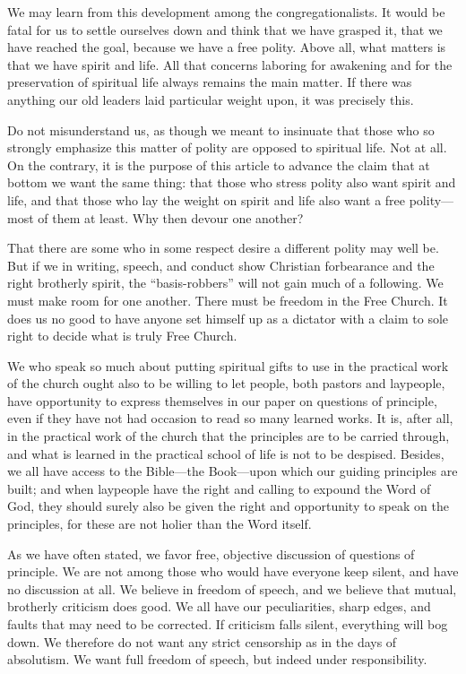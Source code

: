 We may learn from this development among the congregationalists. It would be fatal for us to settle ourselves down and think that we have grasped it, that we have reached the goal, because we have a free polity. Above all, what matters is that we have spirit and life. All that concerns laboring for awakening and for the preservation of spiritual life always remains the main matter. If there was anything our old leaders laid particular weight upon, it was precisely this.

Do not misunderstand us, as though we meant to insinuate that those who so strongly emphasize this matter of polity are opposed to spiritual life. Not at all. On the contrary, it is the purpose of this article to advance the claim that at bottom we want the same thing: that those who stress polity also want spirit and life, and that those who lay the weight on spirit and life also want a free polity---most of them at least. Why then devour one another?

That there are some who in some respect desire a different polity may well be. But if we in writing, speech, and conduct show Christian forbearance and the right brotherly spirit, the ``basis-robbers'' will not gain much of a following. We must make room for one another. There must be freedom in the Free Church. It does us no good to have anyone set himself up as a dictator with a claim to sole right to decide what is truly Free Church.

We who speak so much about putting spiritual gifts to use in the practical work of the church ought also to be willing to let people, both pastors and laypeople, have opportunity to express themselves in our paper on questions of principle, even if they have not had occasion to read so many learned works. It is, after all, in the practical work of the church that the principles are to be carried through, and what is learned in the practical school of life is not to be despised. Besides, we all have access to the Bible---the Book---upon which our guiding principles are built; and when laypeople have the right and calling to expound the Word of God, they should surely also be given the right and opportunity to speak on the principles, for these are not holier than the Word itself.

As we have often stated, we favor free, objective discussion of questions of principle. We are not among those who would have everyone keep silent, and have no discussion at all. We believe in freedom of speech, and we believe that mutual, brotherly criticism does good. We all have our peculiarities, sharp edges, and faults that may need to be corrected. If criticism falls silent, everything will bog down. We therefore do not want any strict censorship as in the days of absolutism. We want full freedom of speech, but indeed under responsibility.

